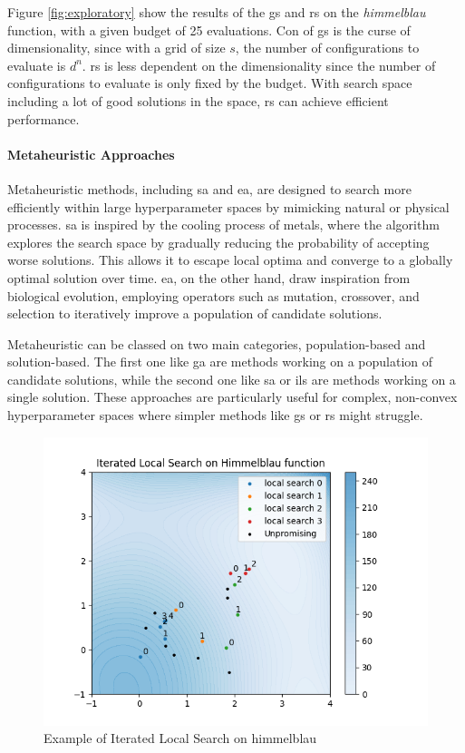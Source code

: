 Figure \ref{fig:exploratory} show the results of the \acrshort{gs} and \acrshort{rs} on the \textit{himmelblau} function, with a given budget of 25 evaluations. Con of \acrshort{gs} is the curse of dimensionality, since with a grid of size $s$, the number of configurations to evaluate is $d^n$. \acrshort{rs} is less dependent on the dimensionality since the number of configurations to evaluate is only fixed by the budget. With search space including a lot of good solutions in the space, \acrshort{rs} can achieve efficient performance.

\paragraph{Metaheuristic Approaches}  

Metaheuristic methods, including \acrfull{sa} and \acrfull{ea}, are designed to search more efficiently within large hyperparameter spaces by mimicking natural or physical processes. \acrshort{sa} is inspired by the cooling process of metals, where the algorithm explores the search space by gradually reducing the probability of accepting worse solutions. This allows it to escape local optima and converge to a globally optimal solution over time. \acrshort{ea}, on the other hand, draw inspiration from biological evolution, employing operators such as mutation, crossover, and selection to iteratively improve a population of candidate solutions.

Metaheuristic can be classed on two main categories, population-based and solution-based. The first one like \acrshort{ga} are methods working on a population of candidate solutions, while the second one like \acrshort{sa} or \acrfull{ils} are methods working on a single solution. These approaches are particularly useful for complex, non-convex hyperparameter spaces where simpler methods like \acrshort{gs} or \acrshort{rs} might struggle.

\begin{figure}[h]
    \centering
    \includegraphics[width=0.5\linewidth]{assets/img/chap_2/plots/ils.png}
    \caption{Example of Iterated Local Search on himmelblau}
    \label{fig:ils}
\end{figure}

